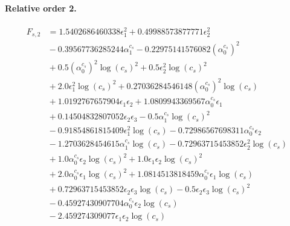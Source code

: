 \documentclass[10pt]{article}
\begin{document}
\paragraph{Relative order 2.}
\begin{align*}
F_{s,2} &= 1.5402686460338 \epsilon_{1}^{2} + 0.49988573877771 \epsilon_{2}^{2} \\
&{}  - 0.39567736285244 \alpha_{1}^{c_s} - 0.22975141576082 \left(\alpha_{0}^{c_s}\right)^{2} \\
&{}  + 0.5 \left(\alpha_{0}^{c_s}\right)^{2} \log{\left(c_{s} \right)}^{2} + 0.5 \epsilon_{2}^{2} \log{\left(c_{s} \right)}^{2} \\
&{}  + 2.0 \epsilon_{1}^{2} \log{\left(c_{s} \right)}^{2} + 0.27036284546148 \left(\alpha_{0}^{c_s}\right)^{2} \log{\left(c_{s} \right)} \\
&{}  + 1.0192767657904 \epsilon_{1} \epsilon_{2} + 1.0809943369567 \alpha_{0}^{c_s} \epsilon_{1} \\
&{}  + 0.14504832807052 \epsilon_{2} \epsilon_{3} - 0.5 \alpha_{1}^{c_s} \log{\left(c_{s} \right)}^{2} \\
&{}  - 0.91854861815409 \epsilon_{1}^{2} \log{\left(c_{s} \right)} - 0.72986567698311 \alpha_{0}^{c_s} \epsilon_{2} \\
&{}  - 1.2703628454615 \alpha_{1}^{c_s} \log{\left(c_{s} \right)} - 0.72963715453852 \epsilon_{2}^{2} \log{\left(c_{s} \right)} \\
&{}  + 1.0 \alpha_{0}^{c_s} \epsilon_{2} \log{\left(c_{s} \right)}^{2} + 1.0 \epsilon_{1} \epsilon_{2} \log{\left(c_{s} \right)}^{2} \\
&{}  + 2.0 \alpha_{0}^{c_s} \epsilon_{1} \log{\left(c_{s} \right)}^{2} + 1.0814513818459 \alpha_{0}^{c_s} \epsilon_{1} \log{\left(c_{s} \right)} \\
&{}  + 0.72963715453852 \epsilon_{2} \epsilon_{3} \log{\left(c_{s} \right)} - 0.5 \epsilon_{2} \epsilon_{3} \log{\left(c_{s} \right)}^{2} \\
&{}  - 0.45927430907704 \alpha_{0}^{c_s} \epsilon_{2} \log{\left(c_{s} \right)} \\
&{}  - 2.459274309077 \epsilon_{1} \epsilon_{2} \log{\left(c_{s} \right)}
\end{align*}
\end{document}

